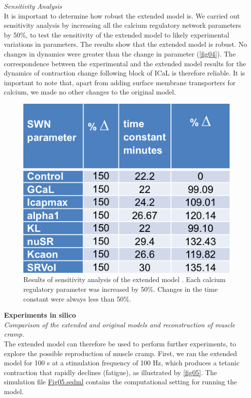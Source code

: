 \documentclass[fleqn,10pt]{physiome}
\begin{document}
\textit{Sensitivity Analysis}\\\newline
It is important to determine how robust the extended model is. We carried out sensitivity analysis by increasing all the calcium regulatory network parameters by 50\%, to test the sensitivity of the extended model to likely experimental variations in parameters. The results show that the extended model is robust. No changes in dynamics were greater than the change in parameter (\autoref{fig04}). The correspondence between the experimental and the extended model results for the dynamics of contraction change following block of ICaL is therefore reliable. It is important to note that, apart from adding surface membrane transporters for calcium, we made no other changes to the original model.\newline
\begin{figure}[h!]
\centering
\includegraphics[width=0.43\linewidth]{figure04}
\caption{Results of sensitivity analysis of the extended model \citep{Noble2019Incorporation}.  Each calcium regulatory parameter was increased by 50\%. Changes in the time constant were always less than 50\%.}
\label{fig04}
\end{figure}
\textbf{Experiments in silico}\\\newline
\textit{Comparison of the extended and original models and reconstruction of muscle cramp.}\\\newline
The extended model can therefore be used to perform further experiments, to explore the possible reproduction of muscle cramp. First, we ran the extended model for 100 s at a stimulation frequency of 100 Hz, which produces a tetanic contraction that rapidly declines (fatigue), as illustrated by \autoref{fig05}. The simulation file \href{http://models.cellml.org/workspace/5f4/file/4071d5b4ec40c5e2b845a7a75e942df1966d2ba2/Fig05.sedml}{Fig05.sedml} contains the computational setting for running the model.\newpage
\end{document}
